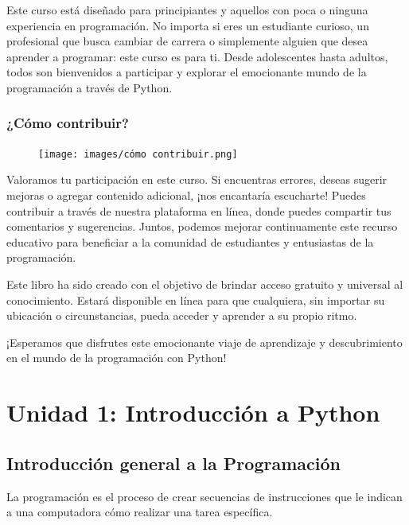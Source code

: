 \documentclass[
  a4paper,
  DIV=11,
  numbers=noendperiod,
  onepage,
  openany]{scrreprt}
\begin{document}
Este curso está diseñado para principiantes y aquellos con poca o
ninguna experiencia en programación. No importa si eres un estudiante
curioso, un profesional que busca cambiar de carrera o simplemente
alguien que desea aprender a programar: este curso es para ti. Desde
adolescentes hasta adultos, todos son bienvenidos a participar y
explorar el emocionante mundo de la programación a través de Python.

\section{¿Cómo contribuir?}\label{cuxf3mo-contribuir}

\begin{figure}

{\centering \texttt{[image: images/cómo contribuir.png]}

}

\end{figure}

Valoramos tu participación en este curso. Si encuentras errores, deseas
sugerir mejoras o agregar contenido adicional, ¡nos encantaría
escucharte! Puedes contribuir a través de nuestra plataforma en línea,
donde puedes compartir tus comentarios y sugerencias. Juntos, podemos
mejorar continuamente este recurso educativo para beneficiar a la
comunidad de estudiantes y entusiastas de la programación.

Este libro ha sido creado con el objetivo de brindar acceso gratuito y
universal al conocimiento. Estará disponible en línea para que
cualquiera, sin importar su ubicación o circunstancias, pueda acceder y
aprender a su propio ritmo.

¡Esperamos que disfrutes este emocionante viaje de aprendizaje y
descubrimiento en el mundo de la programación con Python!

\part{Unidad 1: Introducción a Python}

\chapter{Introducción general a la
Programación}\label{introducciuxf3n-general-a-la-programaciuxf3n}

La programación es el proceso de crear secuencias de instrucciones que
le indican a una computadora cómo realizar una tarea específica.
\end{document}
